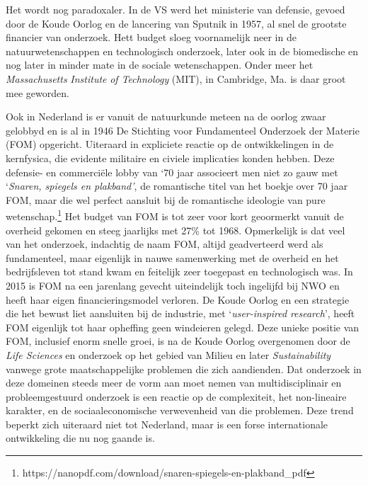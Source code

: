 \documentclass[smallauthor, chapterhaspagenum, nochapterinheader, pagenuminheader,  bigchapnum,medium2, tocpages, garamond, titleinheader]{jote-book}
\begin{document}
	Het wordt nog paradoxaler. In de VS werd het ministerie van defensie, gevoed door de Koude Oorlog en de lancering van Sputnik in 1957, al snel de grootste financier van onderzoek. Hett budget sloeg voornamelijk neer in de natuurwetenschappen en technologisch onderzoek, later ook in de biomedische en nog later in minder mate in de sociale wetenschappen. Onder meer het \emph{Massachusetts }\emph{Institute}\emph{ of Technology} (MIT), in Cambridge, Ma. is daar groot mee geworden.



	Ook in Nederland is er vanuit de natuurkunde meteen na de oorlog zwaar gelobbyd en is al in 1946 De Stichting voor Fundamenteel Onderzoek der Materie (FOM) opgericht. Uiteraard in expliciete reactie op de ontwikkelingen in de kernfysica, die evidente militaire en civiele implicaties konden hebben. Deze defensie- en commerciële lobby van ‘70 jaar associeert men niet zo gauw met ‘\emph{Snaren, spiegels en plakband'}, de romantische titel van het boekje over 70 jaar FOM, maar die wel perfect aansluit bij de romantische ideologie van pure wetenschap.\footnote{https://nanopdf.com/download/snaren-spiegels-en-plakband\_pdf} Het budget van FOM is tot zeer voor kort geoormerkt vanuit de overheid gekomen en steeg jaarlijks met 27\% tot 1968. Opmerkelijk is dat veel van het onderzoek, indachtig de naam FOM, altijd geadverteerd werd als fundamenteel, maar eigenlijk in nauwe samenwerking met de overheid en het bedrijfsleven tot stand kwam en feitelijk zeer toegepast en technologisch was. In 2015 is FOM na een jarenlang gevecht uiteindelijk toch ingelijfd bij NWO en heeft haar eigen financieringsmodel verloren. De Koude Oorlog en een strategie die het bewust liet aansluiten bij de industrie, met ‘\emph{user-}\emph{inspired}\emph{ research}', heeft FOM eigenlijk tot haar opheffing geen windeieren gelegd. Deze unieke positie van FOM, inclusief enorm snelle groei, is na de Koude Oorlog overgenomen door de \emph{Life Sciences} en onderzoek op het gebied van Milieu en later \emph{Sustainability} vanwege grote maatschappelijke problemen die zich aandienden. Dat onderzoek in deze domeinen steeds meer de vorm aan moet nemen van multidisciplinair en probleemgestuurd onderzoek is een reactie op de complexiteit, het non-lineaire karakter, en de sociaaleconomische verwevenheid van die problemen. Deze trend beperkt zich uiteraard niet tot Nederland, maar is een forse internationale ontwikkeling die nu nog gaande is.
\end{document}
